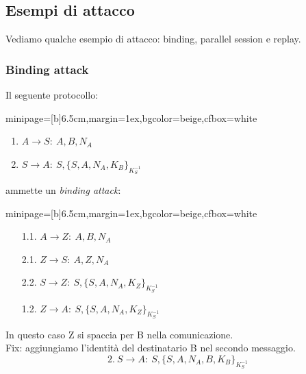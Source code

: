 \documentclass[a4paper, 11pt, twoside, openright, fleqn]{report}
\newcommand{\fromto}[2]{#1\rightarrow #2\!:\ }
\newenvironment{colbox}[2]%
{%
	\par\noindent\hspace{10pt}
	\begin{adjustbox}{minipage=[b]{#2},margin=1ex,bgcolor=#1,cfbox=white}
}{%
	\end{adjustbox}\newline%
}
\begin{document}
\subsection{Esempi di attacco}
Vediamo qualche esempio di attacco: binding, parallel session e replay.

\subsubsection{Binding attack}
Il seguente protocollo:
\begin{colbox}{beige}{6.5cm}
	\begin{enumerate}
		\item $\fromto{A}{S}A,B,N_A$
		\item $\fromto{S}{A}S,\{S,A,N_A,K_B\}_{K_S^{-1}}$
	\end{enumerate}
\end{colbox}
ammette un \emph{binding attack}:
\begin{colbox}{beige}{6.5cm}
	\begin{enumerate}
		\item[1.1.] $\fromto{A}{Z}A,B,N_A$
		\item[2.1.] $\fromto{Z}{S}A,Z,N_A$
		\item[2.2.] $\fromto{S}{Z}S,\{S,A,N_A,K_Z\}_{K_S^{-1}}$
		\item[1.2.] $\fromto{Z}{A}S,\{S,A,N_A,K_Z\}_{K_S^{-1}}$
	\end{enumerate}
\end{colbox}
In questo caso Z si spaccia per B nella comunicazione.\\
Fix: aggiungiamo l'identità del destinatario B nel secondo messaggio.
\begin{equation*}
	2.\ \fromto{S}{A}S,\{S,A,N_A,B,K_B\}_{K_S^{-1}}
\end{equation*}
\end{document}
